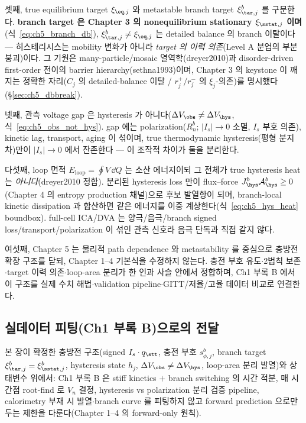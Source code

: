 셋째, true equilibrium target $\xi_{\eq,j}$ 와 metastable branch target $\xi_{\tar,j}^b$ 를 구분한다.
\textbf{branch target 은 Chapter 3 의 nonequilibrium stationary $\xi_{\sstat,j}$ 이며}(식~\eqref{eq:ch5_branch_db}),
$\xi_{\tar,j}^b\ne\xi_{\eq,j}$ 는 detailed balance 의 branch 이탈이다 — 히스테리시스는 mobility 변화가 아니라
\emph{target 의 이력 의존}(Level A 분업의 부분 붕괴)이다. 그 기원은 many-particle/mosaic 열역학(dreyer2010)과
disorder-driven first-order 전이의 barrier hierarchy(sethna1993)이며, Chapter 3 의 keystone 이 깨지는 정확한
자리($C_j$ 의 detailed-balance 이탈 / $r_j^+/r_j^-$ 의 $\xi_j$-의존)를 명시했다(\S\ref{sec:ch5_dbbreak}).

넷째, 관측 voltage gap 은 hysteresis 가 아니다(\textbf{$\Delta V_\obs\ne\Delta V_\hys$}, 식~\eqref{eq:ch5_obs_not_hys}).
gap 에는 polarization($R_n^b$; $|I_s|\to0$ 소멸, $I_s$ 부호 의존), kinetic lag, transport, aging 이 섞이며,
true thermodynamic hysteresis(평형 분지 차)만이 $|I_s|\to0$ 에서 잔존한다 — 이 조작적 차이가 둘을 분리한다.

다섯째, loop 면적 $E_{\mathrm{loop}}=\oint V\,\dd Q$ 는 소산 에너지이되 그 전체가 true hysteresis heat 는
\emph{아니다}(dreyer2010 정합). 분리된 hysteresis loss 만이 flux--force $J_\hys^b\mathcal A_\hys^b\ge0$
(Chapter 4 의 entropy production 채널)으로 후보 발열항이 되며, branch-local kinetic dissipation 과 합산하면
같은 에너지를 이중 계상한다(식~\eqref{eq:ch5_hys_heat} boundbox). full-cell ICA/DVA 는 양극/음극/branch signed
loss/transport/polarization 이 섞인 관측 신호라 음극 단독과 직접 같지 않다.

여섯째, Chapter 5 는 물리적 path dependence 와 metastability 를 중심으로 충방전 확장 구조를 닫되, Chapter 1--4
기본식을 수정하지 않는다. 충전 부호 유도$\cdot$2법칙 보존$\cdot$target 이력 의존$\cdot$loop-area 분리가 한 인과
사슬 안에서 정합하며, Ch1 부록 B 에서 이 구조를 실제 수치 해법$\cdot$validation pipeline$\cdot$GITT/저율/고율
데이터 비교로 연결한다.

\subsection*{실데이터 피팅(Ch1 부록 B)으로의 전달}
본 장이 확정한 충방전 구조(signed $I_s\cdot q_\stt$, 충전 부호 $s_{\phi,j}^b$, branch target $\xi_{\tar,j}^b
=\xi_{\sstat,j}^b$, hysteresis state $h_j$, $\Delta V_\obs\ne\Delta V_\hys$, loop-area 분리 발열)와 상태변수
위에서: Ch1 부록 B 은 stiff kinetics $+$ branch switching 의 시간 적분, 매 시간점 root-find 로 $V_n$ 결정,
hysteresis vs polarization 분리 검증 pipeline, calorimetry 부재 시 발열$\cdot$branch curve 를 피팅하지 않고
forward prediction 으로만 두는 제한을 다룬다(Chapter 1--4 의 forward-only 원칙).



